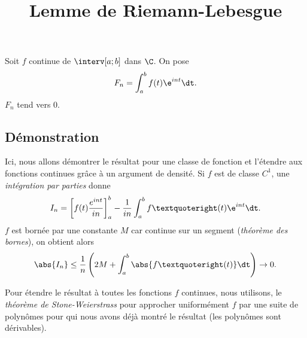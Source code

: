 \documentclass[fontsize=12pt,twoside=false,parskip=half]{scrartcl}
\title{Lemme de Riemann-Lebesgue}
\date{}
\author{}
\begin{document}
\maketitle
   \begin{Theoreme}
      Soit $f$ continue de $\interv[a; b]$ dans $\C$. On pose
      \[
         F_n = \int_a^b f(t)\e^{int} \dt.
      \]
      $F_n$ tend vers 0.
   \end{Theoreme}
   \subsection{Démonstration}
      Ici, nous allons démontrer le résultat pour une classe de fonction et l’étendre aux fonctions continues 
      grâce à un argument de densité. Si $f$ est de classe $C^1$, une \emph{intégration par parties} donne
      \[
         I_n = \left[f(t) \frac{e^{int}}{in}\right]_a^b - \frac{1}{in} \int_a^b f’(t)\e^{int} \dt.
      \]
      $f$ est bornée par une constante $M$ car continue sur un segment (\emph{théorème des bornes}), on obtient alors
      \[
         \abs{I_n} \leq \frac{1}{n} \left(2M + \int_a^b \abs{f’(t)} \dt\right) \to 0.
      \]
      
      Pour étendre le résultat à toutes les fonctions $f$ continues, nous utilisons, le
      \emph{théorème de Stone-Weierstrass} pour approcher uniformément $f$ par une suite de polynômes pour qui nous
      avons déjà montré le résultat (les polynômes sont dérivables).
\end{document}

